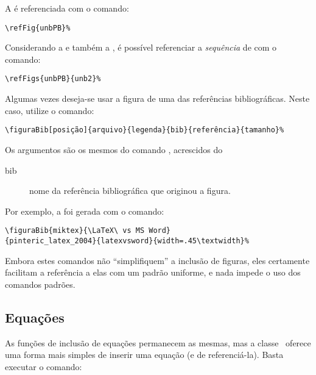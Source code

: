 A  é referenciada com o comando:
\begin{verbatim}
\refFig{unbPB}%
\end{verbatim}

%

Considerando a  e também a , é possível referenciar
a \emph{sequência} de  com o comando:
\begin{verbatim}
\refFigs{unbPB}{unb2}%
\end{verbatim}

Algumas vezes deseja-se usar a figura de uma das referências bibliográficas. Neste caso, utilize o comando:

\begin{verbatim}
\figuraBib[posição]{arquivo}{legenda}{bib}{referência}{tamanho}%
\end{verbatim}

Os argumentos são os mesmos do comando , acrescidos do
\begin{description}
\item[bib] nome da referência bibliográfica que originou a figura.
\end{description}

Por exemplo, a  foi gerada com o comando:
\begin{verbatim}
\figuraBib{miktex}{\LaTeX\ vs MS Word}
{pinteric_latex_2004}{latexvsword}{width=.45\textwidth}%
\end{verbatim}

Embora estes comandos não ``simplifiquem'' a inclusão de figuras, eles
certamente facilitam a referência a elas com um padrão uniforme, e nada impede o
uso dos comandos padrões.

%



\subsection{Equações}
As funções de inclusão de equações permanecem as mesmas, mas a classe \unbcic\
oferece uma forma mais simples de inserir uma equação (e de referenciá-la). Basta
executar o comando:

